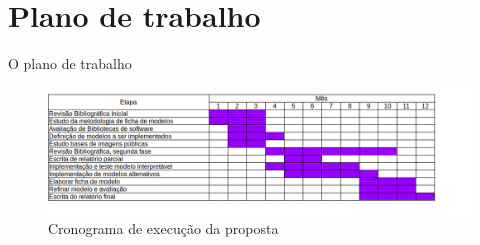 \documentclass[12pt]{article}
\begin{document}

\bigskip

\section{Plano de trabalho}
\label{sec:schedule}

O plano de trabalho


\begin{figure}[htb]
 \centering
 \includegraphics[width=1.0\textwidth]{images/crono2022}
 \caption{Cronograma de execução da proposta}
 \label{fig:crono}
\end{figure}

\bigskip


\end{document}
